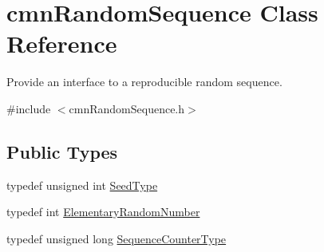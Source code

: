 \hypertarget{classcmn_random_sequence}{\section{cmn\-Random\-Sequence Class Reference}
\label{classcmn_random_sequence}
}


Provide an interface to a reproducible random sequence.  




{\ttfamily \#include $<$cmn\-Random\-Sequence.\-h$>$}

\subsection*{Public Types}
\begin{DoxyCompactItemize}
\item 
typedef unsigned int \hyperlink{classcmn_random_sequence_a7b97009536ce38559fa5fb86a9eea16d}{Seed\-Type}
\item 
typedef int \hyperlink{classcmn_random_sequence_a4728645d25009df6b70fd0db6340f92f}{Elementary\-Random\-Number}
\item 
typedef unsigned long \hyperlink{classcmn_random_sequence_ac3befd667513146020ef266429e205b0}{Sequence\-Counter\-Type}
\end{DoxyCompactItemize}
